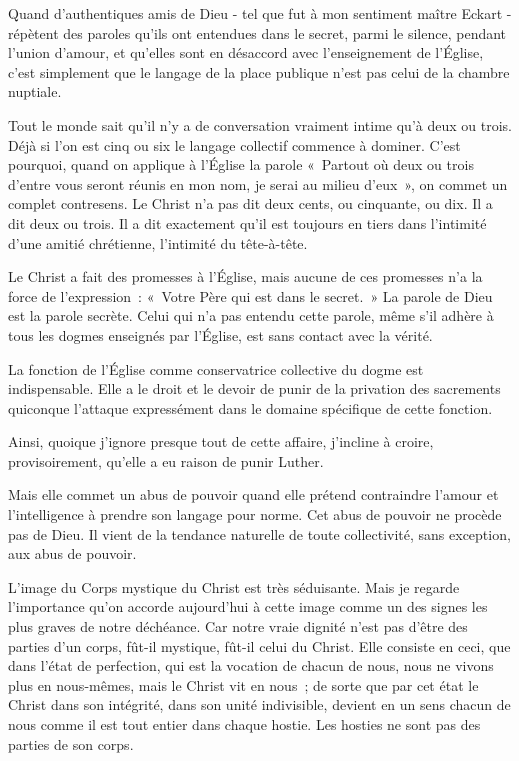 \documentclass[french,twoside]{book} %
\begin{document}
Quand d'authentiques amis de Dieu - tel que fut à mon sentiment maître Eckart - répètent des paroles qu'ils ont entendues dans le secret, parmi le silence, pendant l'union d'amour, et qu'elles sont en désaccord avec l'enseignement de l'Église, c'est simplement que le langage de la place publique n'est pas celui de la chambre nuptiale.\par
Tout le monde sait qu'il n'y a de conversation vraiment intime qu'à deux ou trois. Déjà si l'on est cinq ou six le langage collectif commence à dominer. C'est pourquoi, quand on applique à l'Église la parole « Partout où deux ou trois d'entre vous seront réunis en mon nom, je serai au milieu d'eux », on commet un complet contresens. Le Christ n'a pas dit deux cents, ou cinquante, ou dix. Il a dit deux ou trois. Il a dit exactement qu'il est toujours en tiers dans l'intimité d'une amitié chrétienne, l'intimité du tête-à-tête.\par
Le Christ a fait des promesses à l'Église, mais aucune de ces promesses n'a la force de l'expression : « Votre Père qui est dans le secret. » La parole de Dieu est la parole secrète. Celui qui n'a pas entendu cette parole, même s'il adhère à tous les dogmes enseignés par l'Église, est sans contact avec la vérité.\par
La fonction de l'Église comme conservatrice collective du dogme est indispensable. Elle a le droit et le devoir de punir de la privation des sacrements quiconque l'attaque expressément dans le domaine spécifique de cette fonction.\par
Ainsi, quoique j'ignore presque tout de cette affaire, j'incline à croire, provisoirement, qu'elle a eu raison de punir Luther.\par
Mais elle commet un abus de pouvoir quand elle prétend contraindre l'amour et l'intelligence à prendre son langage pour norme. Cet abus de pouvoir ne procède pas de Dieu. Il vient de la tendance naturelle de toute collectivité, sans exception, aux abus de pouvoir.\par
L'image du Corps mystique du Christ est très séduisante. Mais je regarde l'importance qu'on accorde aujourd'hui à cette image comme un des signes les plus graves de notre déchéance. Car notre vraie dignité n'est pas d'être des parties d'un corps, fût-il mystique, fût-il celui du Christ. Elle consiste en ceci, que dans l'état de perfection, qui est la vocation de chacun de nous, nous ne vivons plus en nous-mêmes, mais le Christ vit en nous ; de sorte que par cet état le Christ dans son intégrité, dans son unité indivisible, devient en un sens chacun de nous comme il est tout entier dans chaque hostie. Les hosties ne sont pas des parties de son corps.\par
\end{document}
